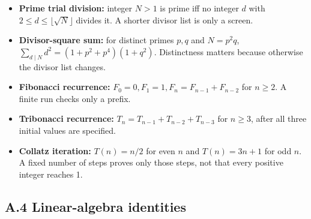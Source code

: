 \documentclass[
  10pt,
]{article}
\begin{document}
\begin{itemize}
  integer \(N\ge0\), \(N\) is a square iff
  \(\lfloor\sqrt N\rfloor^2=N\). Negative integers are not integer
  squares.
\item
  \textbf{Prime trial division:} integer \(N>1\) is prime iff no integer
  \(d\) with \(2\le d\le\lfloor\sqrt N\rfloor\) divides it. A shorter
  divisor list is only a screen.
\item
  \textbf{Divisor-square sum:} for distinct primes \(p,q\) and
  \(N=p^2q\), \(\sum_{d\mid N}d^2=(1+p^2+p^4)(1+q^2)\). Distinctness
  matters because otherwise the divisor list changes.
\item
  \textbf{Fibonacci recurrence:} \(F_0=0,F_1=1,F_n=F_{n-1}+F_{n-2}\) for
  \(n\ge2\). A finite run checks only a prefix.
\item
  \textbf{Tribonacci recurrence:} \(T_n=T_{n-1}+T_{n-2}+T_{n-3}\) for
  \(n\ge3\), after all three initial values are specified.
\item
  \textbf{Collatz iteration:} \(T(n)=n/2\) for even \(n\) and
  \(T(n)=3n+1\) for odd \(n\). A fixed number of steps proves only those
  steps, not that every positive integer reaches 1.
\end{itemize}

\subsection{A.4 Linear-algebra
identities}\label{a.4-linear-algebra-identities}
\end{document}
